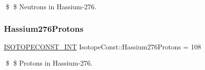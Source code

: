 \$ \$ Neutrons in Hassium-\/276. \mbox{\label{group___isotope_const-_hassium-_hs276_ga29d1bbfd4a5cab582f61a43c714a57a7}} 
\subsubsection{\texorpdfstring{Hassium276\+Protons}{Hassium276Protons}}
{\footnotesize\ttfamily \mbox{\hyperlink{group___isotope_const-_macros_ga5f18360b3e99483a35c32d789e62621c}{I\+S\+O\+T\+O\+P\+E\+C\+O\+N\+S\+T\+\_\+\+I\+NT}} Isotope\+Const\+::\+Hassium276\+Protons = 108}

\$ \$ Protons in Hassium-\/276. 